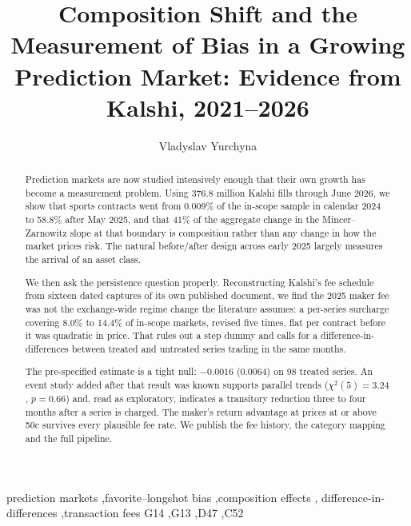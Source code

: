 \documentclass[preprint,12pt,authoryear]{elsarticle}
\begin{document}
\begin{frontmatter}

\title{Composition Shift and the Measurement of Bias in a Growing
Prediction Market: Evidence from Kalshi, 2021--2026}

\author{Vladyslav Yurchyna}
\address{Independent Researcher}

\begin{abstract}
Prediction markets are now studied intensively enough that their own growth has
become a measurement problem. Using 376.8 million Kalshi fills through June
2026, we show that sports contracts went from 0.009\% of the in-scope sample in
calendar 2024 to 58.8\% after May 2025, and that 41\% of the aggregate change in
the Mincer--Zarnowitz slope at that boundary is composition rather than any
change in how the market prices risk. The natural before/after design across
early 2025 largely measures the arrival of an asset class.

We then ask the persistence question properly. Reconstructing Kalshi's fee
schedule from sixteen dated captures of its own published document, we find the
2025 maker fee was not the exchange-wide regime change the literature assumes: a
per-series surcharge covering 8.0\% to 14.4\% of in-scope markets, revised five
times, flat per contract before it was quadratic in price. That rules out a step
dummy and calls for a difference-in-differences between treated and untreated
series trading in the same months.

The pre-specified estimate is a tight null: $-0.0016$ (0.0064) on 98 treated
series. An event study added after that result was known supports parallel
trends ($\chi^2(5) = 3.24$, $p = 0.66$) and, read as exploratory, indicates a
transitory reduction three to four months after a series is charged. The maker's
return advantage at prices at or above 50c survives every plausible fee rate. We
publish the fee history, the category mapping and the full pipeline.
\end{abstract}

\begin{keyword}
prediction markets \sep favorite--longshot bias \sep composition effects \sep
difference-in-differences \sep transaction fees
\JEL G14 \sep G13 \sep D47 \sep C52
\end{keyword}

\end{frontmatter}

\end{document}
